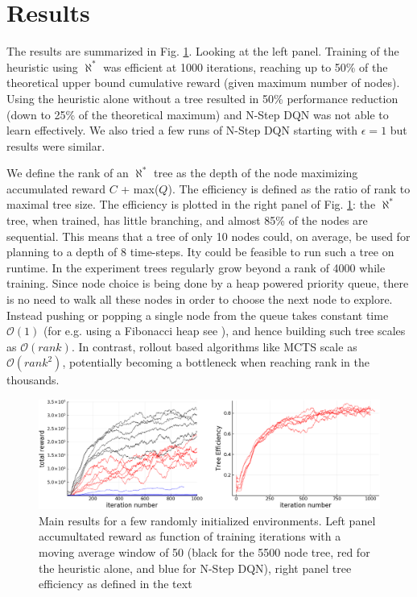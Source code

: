 \documentclass{article}
\newcommand{\alephstar}{$\aleph^*$ }
\begin{document}
\section{Results}
\label{sec:results}

The results are summarized in Fig. \ref{fig:results}. Looking at the left panel. Training of the heuristic using \alephstar was efficient at 1000 iterations, reaching up to 50\% of the theoretical upper bound cumulative reward (given maximum number of nodes). Using the heuristic alone without a tree resulted in 50\% performance reduction (down to 25\% of the theoretical maximum) and N-Step DQN was not able to learn effectively. We also tried a few runs of N-Step DQN starting with $\epsilon=1$ but results were similar.

We define the rank of an \alephstar tree as the depth of the node maximizing accumulated reward $C$ + max($Q$). The efficiency is defined as the ratio of rank to maximal tree size. The efficiency is plotted in the right panel of Fig. \ref{fig:results}: the \alephstar tree, when trained, has little branching, and almost 85\% of the nodes are sequential. This means that a tree of only 10 nodes could, on average, be used for planning to a depth of 8 time-steps. Ity could be feasible to run such a tree on runtime. In the experiment trees regularly grow beyond a rank of 4000 while training. Since node choice is being done by a heap powered priority queue, there is no need to walk all these nodes in order to choose the next node to explore. Instead pushing or popping a single node from the queue takes constant time $\mathcal{O}(1)$ (for e.g. using a Fibonacci heap see \citealt{fredman1987fibonacci}), and hence building such tree scales as $\mathcal{O}(rank)$. In contrast, rollout based algorithms like MCTS scale as $\mathcal{O}(rank^2)$, potentially becoming a bottleneck when reaching rank in the thousands.

\begin{figure}
  \centering
  \includegraphics[width=1.0\textwidth]{images/results.png}
  \caption{Main results for a few randomly initialized environments. Left panel accumultated reward as function of training iterations with a moving average window of 50 (black for the 5500 node tree, red for the heuristic alone, and blue for N-Step DQN), right panel tree efficiency as defined in the text}
  \label{fig:results}
\end{figure}
\end{document}
